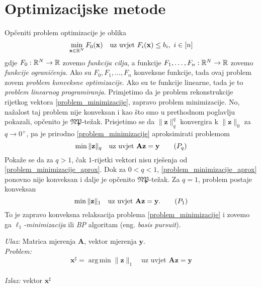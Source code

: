 \documentclass[a4paper,twoside,12pt]{memoir} %
\newcommand{\vect}[1]{\mathbf{#1}}
\renewcommand{\vec}{\vect}
\newcommand{\norm}[1]{\|{#1}\|}
\DeclareMathOperator*{\argmin}{arg\,min}
\newenvironment{alg}[1]
{
    \bigskip
    \begin{tcolorbox}[arc=0mm,boxrule=1.2pt,colframe=black,colback=white,detach title, before upper={\medskip\begin{center}\textbf{#1}\end{center}\hline\newline\medskip},frame hidden]
    \medskip
}
{
    \medskip
\end{tcolorbox}
    \bigskip
}
\begin{document}
\section[Optimizacijske metode][Optimizacijske metode]{Optimizacijske metode}
Op\v{c}eniti problem optimizacije je oblika
\begin{equation*}
    \min_{\vec x \in \R^N} F_0(\vec x)\quad\text{uz uvjet }F_i(\vec x) \leq b_i,\ i \in [n]
\end{equation*}
gdje $F_0:\mathbb{R}^N \rightarrow \mathbb{R}$ zovemo \textit{funkcija cilja}, a funkcije $F_1, \dots, F_n: \mathbb{R}^N \rightarrow \mathbb{R}$ zovemo \textit{funkcije ograni\v{c}enja}. Ako su $F_0, F_1, \dots, F_n$ konveksne funkcije, tada ovaj problem zovem \textit{problem konveksne optimizacije}. Ako su te funkcije linearne, tada je to \textit{problem linearnog programiranja}. Primjetimo da je problem rekonstrukcije rijetkog vektora \eqref{problem_minimizacije}, zapravo problem minimizacije. No, na\v{z}alost taj problem nije konveksan i kao \v{s}to smo u prethodnom poglavlju pokazali, op\v{c}enito je $\mathfrak{NP}$-te\v{z}ak. Prisjetimo se da $\norm{\vec z}_q^q$ konvergira k $\norm{\vec z}_0$ za $q \rightarrow 0^+$, pa je prirodno  \eqref{problem_minimizacije} aproksimirati problemom
\begin{equation}
    \min \norm{\vec z}_q\quad\text{uz uvjet }\vec{Az}=\vec y\tag{$P_{q}$}\label{problem_minimizacije_aprox}
\end{equation}
Poka\v{z}e se da za $q > 1$, \v{c}ak $1$-rijetki vektori nisu rje\v{s}enja od \eqref{problem_minimizacije_aprox}. Dok za $0 < q < 1$, \eqref{problem_minimizacije_aprox} ponovno nije konveksan i dalje je op\v{c}enito $\mathfrak{NP}$-te\v{z}ak. Za $q=1$, problem postaje konveksan
\begin{equation}
    \min \norm{\vec z}_1 \quad \text{uz uvjet }\vec{Az}=\vec y.\tag{$P_{1}$}\label{problem_minimizacije_l1}
\end{equation}
To je zapravo konveksna relaksacija problema \eqref{problem_minimizacije} i zovemo ga $\ell_1$\textit{-minimizacija} ili \textit{BP} algoritam (eng. \textit{basis pursuit}).

\begin{alg}{$\ell_1$-minimizacija (BP)}
    \textit{Ulaz:} Matrica mjerenja $\vec A$, vektor mjerenja $\vec y$. \\
    \textit{Problem:}
        \begin{equation}
            \vec x^{\sharp} = \argmin \norm{\vec z}_1 \quad \text{uz uvjet }\vec{Az}=\vec y\tag{$\ell_1-min$}\label{algoritam_l1_minimizacija}
        \end{equation} \\
        \textit{Izlaz:} vektor $\vec x^{\sharp}$
\end{alg}
\end{document}

